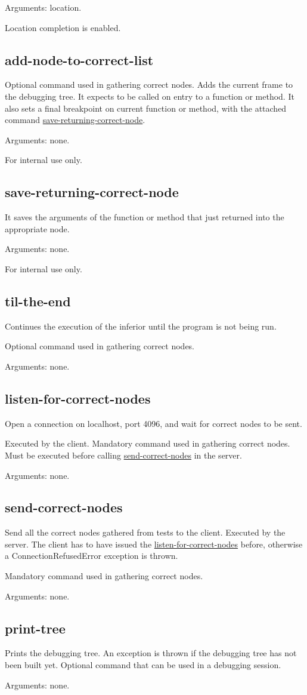 Arguments: location.

Location completion is enabled.
\subsection{add-node-to-correct-list}
\label{command:add-node-to-correct-list}
Optional command used in gathering correct nodes.
Adds the current frame to the debugging tree.
It expects to be called on entry to a function or method.
It also sets a final breakpoint on current function or method, with the attached command \hyperref[command:save-returning-correct-node]{save-returning-correct-node}.

Arguments: none.

For internal use only.
\subsection{save-returning-correct-node}
\label{command:save-returning-correct-node}
It saves the arguments of the function or method that just returned into the appropriate node.

Arguments: none.

For internal use only.
\subsection{til-the-end}
\label{command:til-the-end}
Continues the execution of the inferior until the program is not being run.

Optional command used in gathering correct nodes.

Arguments: none.
\subsection{listen-for-correct-nodes}
\label{command:listen-for-correct-nodes}
Open a connection on localhost, port 4096, and wait for correct nodes to be sent.

Executed by the client.
Mandatory command used in gathering correct nodes.
Must be executed before calling \hyperref[command:send-correct-nodes]{send-correct-nodes} in the server.

Arguments: none.
\subsection{send-correct-nodes}
\label{command:send-correct-nodes}
Send all the correct nodes gathered from tests to the client.
Executed by the server.
The client has to have issued the \hyperref[command:listen-for-correct-nodes]{listen-for-correct-nodes} before, otherwise a ConnectionRefusedError exception is thrown.

Mandatory command used in gathering correct nodes.

Arguments: none.
\subsection{print-tree}
\label{command:print-tree}
Prints the debugging tree.
An exception is thrown if the debugging tree has not been built yet. 
Optional command that can be used in a debugging session.

Arguments: none.
